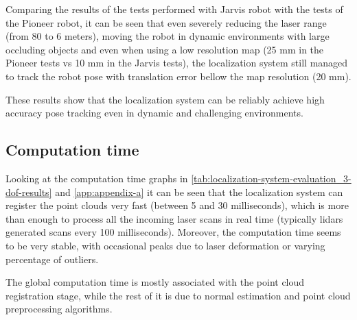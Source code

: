Comparing the results of the tests performed with Jarvis robot  with the tests of the Pioneer robot, it can be seen that even severely reducing the laser range (from 80 to 6 meters), moving the robot in dynamic environments with large occluding objects and even when using a low resolution map (25 mm in the Pioneer tests vs 10 mm in the Jarvis tests), the localization system still managed to track the robot pose with translation error bellow the map resolution (20 mm).

These results show that the localization system can be reliably achieve high accuracy pose tracking even in dynamic and challenging environments.


\subsection{Computation time}

Looking at the computation time graphs in \cref{tab:localization-system-evaluation_3-dof-results} and \cref{app:appendix-a} it can be seen that the localization system can register the point clouds very fast (between 5 and 30 milliseconds), which is more than enough to process all the incoming laser scans in real time (typically \glspl{lidar} generated scans every 100 milliseconds). Moreover, the computation time seems to be very stable, with occasional peaks due to laser deformation or varying percentage of outliers.

The global computation time is mostly associated with the point cloud registration stage, while the rest of it is due to normal estimation and point cloud preprocessing algorithms.



%
%
%
%
%
%
%
